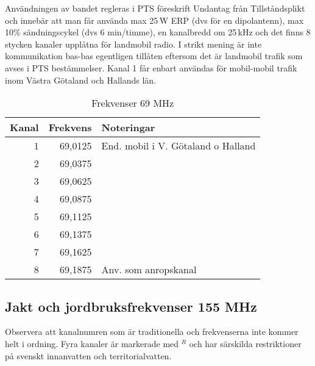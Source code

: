 Användningen av bandet regleras i PTS föreskrift Undantag från Tillståndsplikt
och innebär att man får använda max 25\,W ERP (dvs för en dipolantenn), max
10\% sändningscykel (dvs 6 min/timme), en kanalbredd om 25\,kHz och det finns
8 stycken kanaler upplåtna för landmobil radio. I strikt mening är inte
kommunikation bas-bas egentligen tillåten eftersom det är landmobil trafik som
avses i PTS bestämmelser. Kanal 1 får enbart användas för mobil-mobil trafik
inom Västra Götaland och Hallands län.

\begin{table}[ht]
  \centering
\begin{tabular}{rrl}
	\bf Kanal & \bf Frekvens & \bf Noteringar                     \\ \hline
	        1 &      69,0125 & End. mobil i V. Götaland o Halland \\
	        2 &      69,0375 &                                    \\
	        3 &      69,0625 &                                    \\
	        4 &      69,0875 &                                    \\
	        5 &      69,1125 &                                    \\
	        6 &      69,1375 &                                    \\
	        7 &      69,1625 &                                    \\
	        8 &      69,1875 & Anv. som anropskanal
\end{tabular}
\caption{Frekvenser 69 MHz}
\end{table}

\subsection{Jakt och jordbruksfrekvenser 155 MHz}
\label{155-MHz}

Observera att kanalnumren som är traditionella och frekvenserna inte
kommer helt i ordning. Fyra kanaler är markerade med $^R$ och har
särskilda restriktioner på svenskt innanvatten och territorialvatten.

